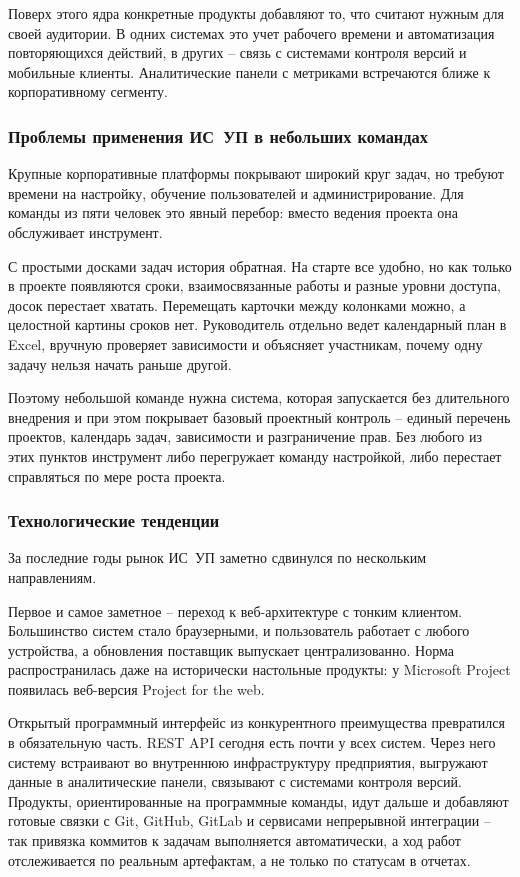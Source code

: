 Поверх этого ядра конкретные продукты добавляют то, что считают нужным для своей аудитории. В одних системах это учет рабочего времени и автоматизация повторяющихся действий, в других -- связь с системами контроля версий и мобильные клиенты. Аналитические панели с метриками встречаются ближе к корпоративному сегменту.

\subsubsection{Проблемы применения ИС~УП в небольших командах}

Крупные корпоративные платформы покрывают широкий круг задач, но требуют времени на настройку, обучение пользователей и администрирование. Для команды из пяти человек это явный перебор: вместо ведения проекта она обслуживает инструмент.

С простыми досками задач история обратная. На старте все удобно, но как только в проекте появляются сроки, взаимосвязанные работы и разные уровни доступа, досок перестает хватать. Перемещать карточки между колонками можно, а целостной картины сроков нет. Руководитель отдельно ведет календарный план в Excel, вручную проверяет зависимости и объясняет участникам, почему одну задачу нельзя начать раньше другой.

Поэтому небольшой команде нужна система, которая запускается без длительного внедрения и при этом покрывает базовый проектный контроль -- единый перечень проектов, календарь задач, зависимости и разграничение прав. Без любого из этих пунктов инструмент либо перегружает команду настройкой, либо перестает справляться по мере роста проекта.

\subsubsection{Технологические тенденции}

За последние годы рынок ИС~УП заметно сдвинулся по нескольким направлениям.

Первое и самое заметное -- переход к веб-архитектуре с тонким клиентом. Большинство систем стало браузерными, и пользователь работает с любого устройства, а обновления поставщик выпускает централизованно. Норма распространилась даже на исторически настольные продукты: у Microsoft Project появилась веб-версия Project for the web.

Открытый программный интерфейс из конкурентного преимущества превратился в обязательную часть. REST API сегодня есть почти у всех систем. Через него систему встраивают во внутреннюю инфраструктуру предприятия, выгружают данные в аналитические панели, связывают с системами контроля версий. Продукты, ориентированные на программные команды, идут дальше и добавляют готовые связки с Git, GitHub, GitLab и сервисами непрерывной интеграции -- так привязка коммитов к задачам выполняется автоматически, а ход работ отслеживается по реальным артефактам, а не только по статусам в отчетах.

